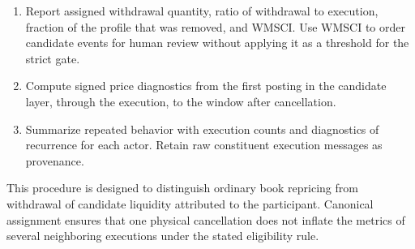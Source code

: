 \documentclass[11pt]{article}
\newenvironment{review}{\begingroup\color{blue}}{\endgroup}
\begin{document}
\begin{enumerate}
    $t_c^{+}$.
    \item Report assigned withdrawal quantity, \begin{review}ratio of withdrawal to execution\end{review}, \begin{review}fraction of the profile that was removed\end{review}, and WMSCI. Use WMSCI
    to order \begin{review}candidate events\end{review} for human review without applying it as \begin{review}a threshold for the strict gate\end{review}.
    \item Compute signed price diagnostics from \begin{review}the first posting in the candidate layer\end{review}, through the execution, to \begin{review}the window after cancellation\end{review}.
    \item Summarize repeated behavior with execution counts and \begin{review}diagnostics of recurrence for each actor\end{review}. Retain \begin{review}raw constituent execution messages\end{review} as provenance.
\end{enumerate}
This procedure is designed to distinguish ordinary book repricing from withdrawal of \begin{review}candidate liquidity attributed to the participant\end{review}. Canonical assignment ensures that one physical cancellation does not inflate the metrics of several neighboring
executions under the stated eligibility rule.
\end{document}
